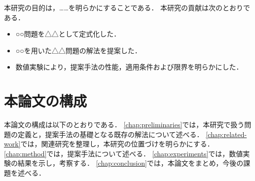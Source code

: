 本研究の目的は，……を明らかにすることである．
本研究の貢献は次のとおりである．
\begin{itemize}
  \item ○○問題を△△として定式化した．
  \item ○○を用いた△△問題の解法を提案した．
  \item 数値実験により，提案手法の性能，適用条件および限界を明らかにした．
\end{itemize}

\section{本論文の構成}
\label{sec:organization}

本論文の構成は以下のとおりである．
\cref{chap:preliminaries}では，本研究で扱う問題の定義と，提案手法の基礎となる既存の解法について述べる．
\cref{chap:related-work}では，関連研究を整理し，本研究の位置づけを明らかにする．
\cref{chap:method}では，提案手法について述べる．
\cref{chap:experiments}では，数値実験の結果を示し，考察する．
\cref{chap:conclusion}では，本論文をまとめ，今後の課題を述べる．
